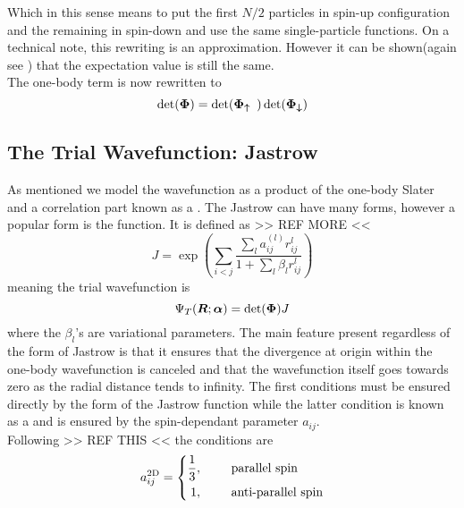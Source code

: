         Which in this sense means to put the first $N/2$ particles in spin-up
        configuration and the remaining in spin-down and use the same
        single-particle functions.  On a technical note, this rewriting is an
        approximation. However it can be shown(again see \cite{splitDet}) that
        the expectation value is still the same.\\
        The one-body term is now rewritten to
            \begin{equation}
                \det(\boldsymbol{{\Phi}}) = \det(\boldsymbol{{\Phi_{\uparrow}}})
                \det(\boldsymbol{{\Phi_{\downarrow}}})
            \end{equation}

    \subsection{The Trial Wavefunction: Jastrow\label{susec:TWFJastrow}}
        As mentioned we model the wavefunction as a product of the one-body
        Slater and a correlation part known as a . The
        Jastrow can have many forms, however a popular form is the
         function. It is defined as\cite{basicMB} >> REF
        MORE <<
            \begin{equation}
                J = \exp\left(\sum\limits_{i<j}\frac{\sum\limits_la^{(l)}_{ij}
                r^l_{ij}}{1 + \sum\limits_l \beta_l r^l_{ij}}\right)
            \end{equation}
        meaning the trial wavefunction is
            \begin{equation}
                {\Psi}_T(\boldsymbol{{R}};\boldsymbol{{\alpha}}) = \det(\boldsymbol{{\Phi}})J
            \end{equation}
        where the $\beta_l$'s are variational parameters. The main feature
        present regardless of the form of Jastrow is that it ensures that the
        divergence at origin within the one-body wavefunction is canceled and
        that the wavefunction itself goes towards zero as the radial distance
        tends to infinity. The first conditions must be ensured directly by the
        form of the Jastrow function while the latter condition is known as a
         and is ensured by the spin-dependant parameter
        $a_{ij}$. \\
        Following >> REF THIS << the conditions are
            \begin{equation}
                a^{\text{2D}}_{ij} = \left\{\begin{aligned}
                        \frac{1}{3},&\indent& &\text{parallel spin} \\
                        1,&\indent& &\text{anti-parallel spin} \\
                    \end{aligned}\right.
            \end{equation}
